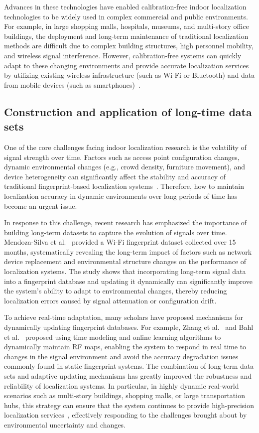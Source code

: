 \documentclass[12pt,a4paper]{article}
\numberwithin{equation}{section}
\begin{document}
Advances in these technologies have enabled calibration-free indoor localization
technologies to be widely used in complex commercial and public
environments. For example, in large shopping malls, hospitals, museums, and
multi-story office buildings, the deployment and long-term maintenance of
traditional localization methods are difficult due to complex building
structures, high personnel mobility, and wireless signal interference. However,
calibration-free systems can quickly adapt to these changing environments and
provide accurate localization services by utilizing existing wireless
infrastructure (such as Wi-Fi or Bluetooth) and data from mobile devices (such
as smartphones)~\cite{laoudias2018survey,xu2019wireless}.

\subsection{Construction and application of long-time data sets}
One of the core challenges facing indoor localization research is the volatility
of signal strength over time. Factors such as access point configuration
changes, dynamic environmental changes (e.g., crowd density, furniture
movement), and device heterogeneity can significantly affect the stability and
accuracy of traditional fingerprint-based localization
systems~\cite{liu2020survey}. Therefore, how to maintain localization accuracy
in dynamic environments over long periods of time has become an urgent issue.

In response to this challenge, recent research has emphasized the importance of
building long-term datasets to capture the evolution of signals over
time. Mendoza-Silva et al.~\cite{data3010003} provided a Wi-Fi fingerprint
dataset collected over 15 months, systematically revealing the long-term impact
of factors such as network device replacement and environmental structure
changes on the performance of localization systems. The study shows that
incorporating long-term signal data into a fingerprint database and updating it
dynamically can significantly improve the system's ability to adapt to
environmental changes, thereby reducing localization errors caused by signal
attenuation or configuration drift.

To achieve real-time adaptation, many scholars have proposed mechanisms for
dynamically updating fingerprint databases. For example, Zhang et
al.~\cite{zhang2019dynamic} and Bahl et al.~\cite{10.1145/2568225.2568272}
proposed using time modeling and online learning algorithms to dynamically
maintain RF maps, enabling the system to respond in real time to changes in the
signal environment and avoid the accuracy degradation issues commonly found in
static fingerprint systems.  The combination of long-term data sets and adaptive
updating mechanisms has greatly improved the robustness and reliability of
localization systems. In particular, in highly dynamic real-world scenarios such
as multi-story buildings, shopping malls, or large transportation hubs, this
strategy can ensure that the system continues to provide high-precision
localization services~\cite{sen2013you, shang2015enhancing}, effectively
responding to the challenges brought about by environmental uncertainty and
changes.
\end{document}
